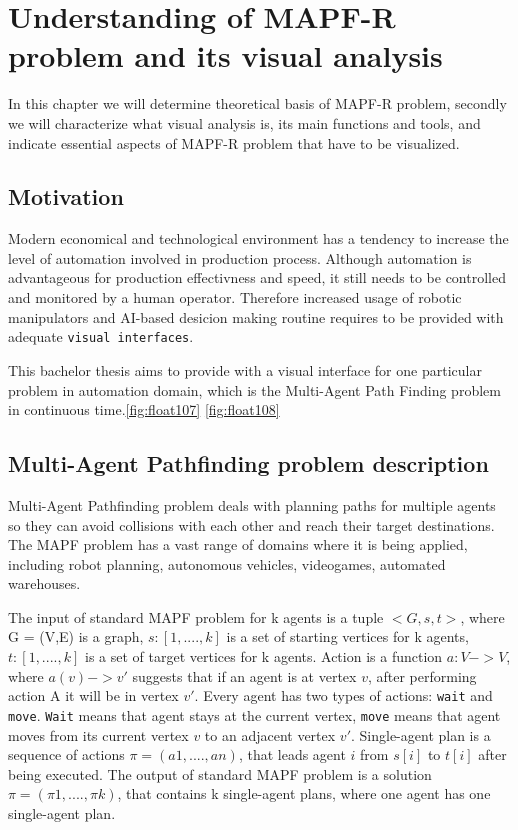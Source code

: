 \documentclass[thesis=B,english]{FITthesis}[2019/12/23]
\begin{document}
\chapter{Understanding of MAPF-R problem and its visual analysis}

In this chapter we will determine theoretical basis of MAPF-R problem,
secondly we will characterize what visual analysis is, its main functions and tools,
and indicate essential aspects of MAPF-R problem that have to be visualized.


\section{Motivation}

Modern economical and technological environment has a tendency to increase the level of automation involved in production process. Although automation is advantageous for production effectivness and speed, it still needs to be controlled and monitored by a human operator. Therefore increased usage of robotic manipulators and AI-based desicion making routine requires to be provided with adequate \verb|visual interfaces|.

This bachelor thesis aims to provide with a visual interface for one particular problem in automation domain, which is the Multi-Agent Path Finding problem in continuous time.\ref{fig:float107} \ref{fig:float108}

\section{Multi-Agent Pathfinding problem description}

Multi-Agent Pathfinding problem deals with planning paths for multiple agents
so they can avoid collisions with each other and reach their target destinations.
The MAPF problem has a vast range of domains where it is being applied, including robot planning, autonomous vehicles, videogames, automated warehouses. 

The input of standard MAPF problem for k agents is a tuple $<G,s,t>$, where G = (V,E) is a graph, $s:[1,....,k]$ is a set of starting vertices for k agents, $t:[1,....,k]$ is a set of target vertices for k agents. Action is a function $a:V->V$, where $a(v)->v'$ suggests that if an agent is at vertex $v$, after performing action A it will be in vertex $v'$. Every agent has two types of actions: \verb|wait| and \verb|move|. \verb|Wait| means that agent stays at the current vertex, \verb|move| means that agent moves from its current vertex $v$ to an adjacent vertex $v'$. Single-agent plan is a sequence of actions $\pi = (a1,....,an)$, that leads agent $i$ from $s[i]$ to $t[i]$ after being executed. The output of standard MAPF problem is a solution $\pi = (\pi 1,...., \pi k)$, that contains k single-agent plans, where one agent has one single-agent plan.\cite{bib_1}
\end{document}
